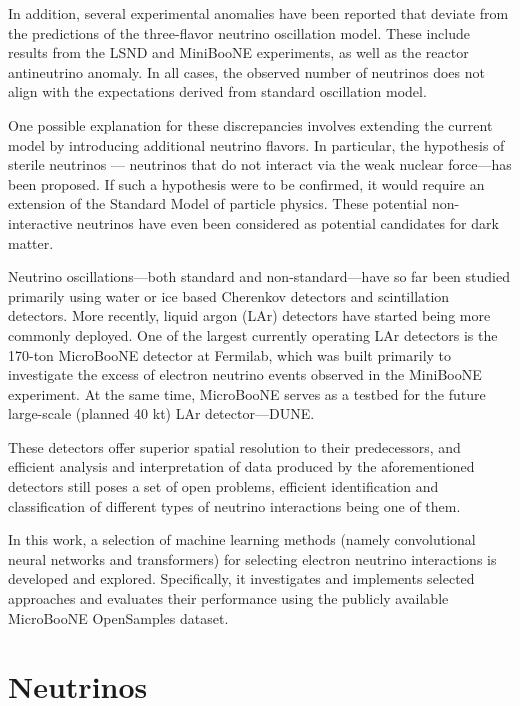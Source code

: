\documentclass{pracalicmgr}
\begin{document}
In addition, several experimental anomalies have been reported that deviate from the predictions of the three-flavor neutrino oscillation model\cite{neutrinoAnomally}. These include results from the LSND and MiniBooNE\cite{MiniBooNE}\cite{LSND} experiments, as well as the reactor antineutrino anomaly\cite{neutrinoAnomally}. In all cases, the observed number of neutrinos does not align with the expectations derived from standard oscillation model\cite{neutrinoAnomally}.

One possible explanation for these discrepancies involves extending the current model by introducing additional neutrino flavors. In particular, the hypothesis of sterile neutrinos — neutrinos that do not interact via the weak nuclear force—has been proposed. If such a hypothesis were to be confirmed, it would require an extension of the Standard Model of particle physics. These potential non-interactive neutrinos have even been considered as potential candidates for dark matter\cite{neutrinoDarkMatter}.

Neutrino oscillations—both standard and non-standard—have so far been studied primarily using water or ice based Cherenkov detectors and scintillation detectors. More recently, liquid argon (LAr) detectors have started being more commonly deployed. One of the largest currently operating LAr detectors is the 170-ton MicroBooNE detector at Fermilab, which was built primarily to investigate the excess of electron neutrino events observed in the MiniBooNE experiment. At the same time, MicroBooNE serves as a testbed for the future large-scale (planned 40 kt) LAr detector—DUNE.

These detectors offer superior spatial resolution to their predecessors, and efficient analysis and interpretation of data produced by the aforementioned detectors still poses a set of open problems, efficient 
identification and classification of different types of neutrino interactions being one of them. 

In this work, a selection of machine learning methods (namely convolutional neural networks and transformers) for selecting electron neutrino interactions is developed and explored. Specifically, it investigates and implements selected approaches and evaluates their performance using the publicly available MicroBooNE OpenSamples dataset.

\chapter{Neutrinos}
\end{document}
